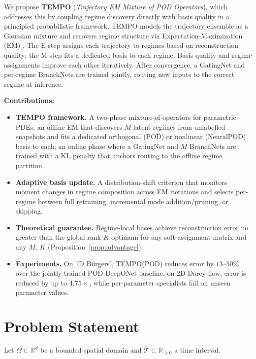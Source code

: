 \documentclass[preprint,10pt]{elsarticle}
\newcommand{\R}{\mathbb{R}}
\newcommand{\T}{\mathcal{T}}
\begin{document}
We propose \textbf{TEMPO} (\textit{Trajectory EM Mixture of POD Operators}),
which addresses this by coupling regime discovery directly with basis quality in a principled probabilistic framework.
TEMPO models the trajectory ensemble as a Gaussian mixture and recovers regime structure via Expectation-Maximization (EM) \cite{Dempster1977}.
The E-step assigns each trajectory to regimes based on reconstruction quality; the M-step fits a dedicated basis to each regime.
Basis quality and regime assignments improve each other iteratively.
After convergence, a GatingNet and per-regime BranchNets are trained jointly, routing new inputs to the correct regime at inference.

\textbf{Contributions:}
\begin{itemize}[leftmargin=1.5em]
  \item \textbf{TEMPO framework.} A two-phase mixture-of-operators for
    parametric PDEs: an offline EM that discovers $M$ latent regimes from
    unlabelled snapshots and fits a dedicated orthogonal (POD) or nonlinear
    (NeuralPOD) basis to each; an online phase where a GatingNet and $M$
    BranchNets are trained with a KL penalty that anchors routing to the
    offline regime partition.

  \item \textbf{Adaptive basis update.} A distribution-shift criterion that
    monitors moment changes in regime composition across EM iterations and
    selects per-regime between full retraining, incremental mode
    addition/pruning, or skipping.

  \item \textbf{Theoretical guarantee.} Regime-local bases achieve
    reconstruction error no greater than the global rank-$K$ optimum for
    any soft-assignment matrix and any $M$, $K$
    (Proposition~\ref{prop:advantage}).

  \item \textbf{Experiments.} On 1D Burgers', TEMPO(POD) reduces error by
    $13$--$50\%$ over the jointly-trained POD-DeepONet baseline; on 2D Darcy
    flow, error is reduced by up to $4.75\times$, while per-parameter
    specialists fail on unseen parameter values.
\end{itemize}


\section{Problem Statement}\label{sec:problem}

Let $\Omega \subset \R^d$ be a bounded spatial domain and $\T \subset \R_{\geq 0}$ a time interval.
\end{document}
